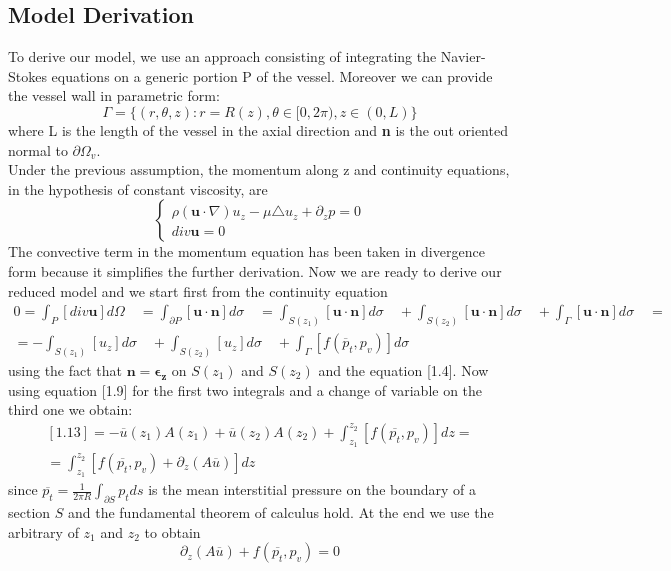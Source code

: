 \documentclass[a4paper]{report}
\begin{document}
\subsection{Model Derivation }
To derive our model, we use an approach consisting of integrating the Navier-Stokes equations on a generic portion P of the vessel. Moreover we can provide the vessel wall in parametric form:
	\begin{equation}
		\Gamma=\{ (r,\theta,z): r=R(z), \theta \in [0,2\pi), z \in (0,L) \}
	\end{equation}
where L is the length of the vessel in the axial direction and \textbf{n} is the out oriented normal to $\partial \Omega_v$.\\
Under the previous assumption, the momentum along z and continuity equations, in the hypothesis of constant viscosity, are
	\begin{equation}
		\begin{cases}
			\rho (\mathbf{u} \cdot \nabla) u_{z} - \mu \triangle u_{z} + \partial_{z} p =0 \\
			div \mathbf{u} = 0
		\end{cases}
	\end{equation}
The convective term in the momentum equation has been taken in divergence form because it simplifies the further derivation.
Now we are ready to derive our reduced model and we start first from the continuity equation
	\begin{equation}
		\begin{split}
		0=\int_P[ div \mathbf{u}] d\Omega \quad= \int_{\partial P}[\mathbf{u} \cdot \mathbf{n} ]d\sigma \quad =\int_{S(z_1)} [\mathbf{u} \cdot \mathbf{n} ]d\sigma \quad + \int_{S(z_2)}[ \mathbf{u} \cdot \mathbf{n}] d\sigma \quad + \int_{\Gamma}[ \mathbf{u} \cdot \mathbf{n}] d\sigma \quad =\\
= -\int_{S(z_1)} [u_z] d\sigma \quad+\int_{S(z_2)}[ u_z] d\sigma \quad+ \int_{\Gamma}[ f(\overline{p}_{t},p_{v})]  d\sigma
		\end{split}
	\end{equation}
using the fact that $\mathbf{n}=\boldsymbol{\epsilon_{z}}$ on $S(z_1)$ and $S(z_2)$ and the equation [1.4]. Now using equation [1.9]  for the first two integrals and a change of variable on the third one we obtain:
	\begin{equation}
		\begin{split}
	[1.13]= -\overline{u}(z_1) A(z_1) + \overline{u}(z_2) A(z_2) + \int^{z_2}_{z_1}[ f(\overline{p_t},p_v)] dz = \\
		=  \int^{z_2}_{z_1}[ f(\overline{p_t},p_v) + \partial_z (A \overline{u})] dz
		\end{split}
	\end{equation}
since $\overline{p_t} = \frac{1}{2 \pi R}\int_{\partial S} p_t ds$ is the mean interstitial pressure on the boundary of a section $S$ and the fundamental theorem of calculus hold. At the end we use the arbitrary of  $z_1$ and $z_2$ to obtain
	\begin{equation}
	\partial_{z}(A \overline{u})+f(\overline{p_t},p_v)=0
	\end{equation}
\end{document}
